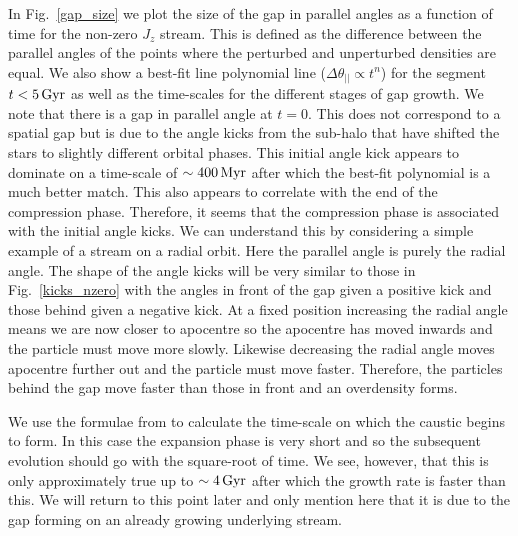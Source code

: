 \documentclass[useAMS,usenatbib,fleqn,a4paper]{mn2e}
\def\Gyr{\,{\rm Gyr}}
\def\Myr{\,{\rm Myr}}
\begin{document}
In Fig.~\ref{gap_size} we plot the size of the gap in parallel angles as a function of time for the non-zero $J_z$ stream. This is defined as the difference between the parallel angles of the points where the perturbed and unperturbed densities are equal. We also show a best-fit line polynomial line ($\Delta\theta_{||}\propto t^n$) for the segment $t<5\Gyr$ as well as the time-scales for the different stages of gap growth. We note that there is a gap in parallel angle at $t=0$. This does not correspond to a spatial gap but is due to the angle kicks from the sub-halo that have shifted the stars to slightly different orbital phases. This initial angle kick appears to dominate on a time-scale of $\sim400\Myr$ after which the best-fit polynomial is a much better match. This also appears to correlate with the end of the compression phase. Therefore, it seems that the compression phase is associated with the initial angle kicks. We can understand this by considering a simple example of a stream on a radial orbit. Here the parallel angle is purely the radial angle. The shape of the angle kicks will be very similar to those in Fig.~\ref{kicks_nzero} with the angles in front of the gap given a positive kick and those behind given a negative kick. At a fixed position increasing the radial angle means we are now closer to apocentre so the apocentre has moved inwards and the particle must move more slowly. Likewise decreasing the radial angle moves apocentre further out and the particle must move faster. Therefore, the particles behind the gap move faster than those in front and an overdensity forms.

We use the formulae from \cite{ErkalBelokurov2015} to calculate the time-scale on which the caustic begins to form. In this case the expansion phase is very short and so the subsequent evolution should go with the square-root of time. We see, however, that this is only approximately true up to $\sim4\Gyr$ after which the growth rate is faster than this. We will return to this point later and only mention here that it is due to the gap forming on an already growing underlying stream.
\end{document}
